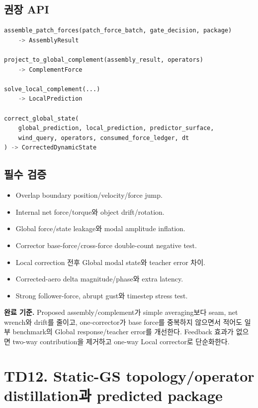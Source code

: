 \documentclass[10pt,a4paper]{article}
\newcommand{\todo}{\textcolor{TodoGray}{\(\square\)}}
\begin{document}
\subsection*{권장 API}

\begin{lstlisting}[language=Python]
assemble_patch_forces(patch_force_batch, gate_decision, package)
    -> AssemblyResult

project_to_global_complement(assembly_result, operators)
    -> ComplementForce

solve_local_complement(...)
    -> LocalPrediction

correct_global_state(
    global_prediction, local_prediction, predictor_surface,
    wind_query, operators, consumed_force_ledger, dt
) -> CorrectedDynamicState
\end{lstlisting}

\subsection*{필수 검증}

\begin{itemize}
  \item[\todo] Overlap boundary position/velocity/force jump.
  \item[\todo] Internal net force/torque와 object drift/rotation.
  \item[\todo] Global force/state leakage와 modal amplitude inflation.
  \item[\todo] Corrector base-force/cross-force double-count negative test.
  \item[\todo] Local correction 전후 Global modal state와 teacher error 차이.
  \item[\todo] Corrected-aero delta magnitude/phase와 extra latency.
  \item[\todo] Strong follower-force, abrupt gust와 timestep stress test.
\end{itemize}

\textbf{완료 기준.}
Proposed assembly/complement가 simple averaging보다 seam, net wrench와 drift를 줄이고,
one-corrector가 base force를 중복하지 않으면서 적어도 일부 benchmark의 Global response/teacher error를 개선한다.
Feedback 효과가 없으면 two-way contribution을 제거하고 one-way Local corrector로 단순화한다.

\section{TD12. Static-GS topology/operator distillation과 predicted package}
\end{document}
